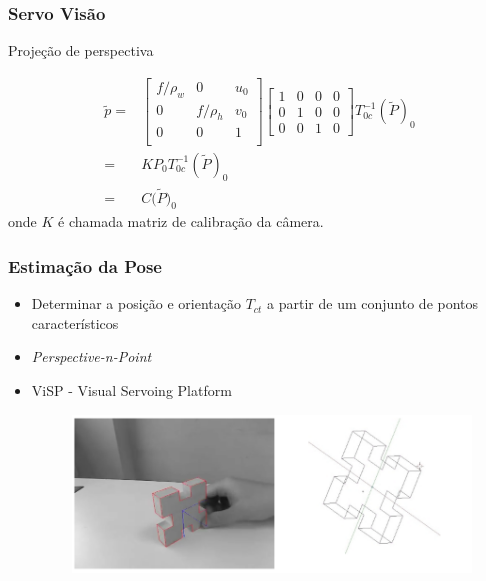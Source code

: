 \documentclass{beamer}
\newcommand\m[1]{\begin{bmatrix}#1\end{bmatrix}}
\begin{document}
\begin{frame}
\frametitle{Servo Visão}

\begin{block}{Projeção de perspectiva} %

\begin{align}\label{eq:camera_projection}
{\tilde{p}} =& 
\m {
	f/\rho_w & 0 & u_0 \\
	0        & f/\rho_h &v_0 \\
	0 & 0 & 1 \\
}
\m{  1 & 0 & 0 & 0\\
	 0 & 1 & 0 & 0\\
	 0 & 0 & 1 & 0	
}
{T}_{0c}^{-1} (\tilde{{P}})_0\\
=& {K} {P}_0 {T}_{0c}^{-1} (\tilde{{P}})_0 \\ 
=& {C} ({\tilde{P})_0}
\end{align}
onde $K$ é chamada matriz de calibração da câmera.
\end{block}
\end{frame}


\begin{frame}
\frametitle{Estimação da Pose}
\begin{itemize}
\item Determinar a posição e orientação ${T}_{ct}$ a partir de um conjunto de pontos característicos
\item \textit{Perspective-n-Point}
\item ViSP - Visual Servoing Platform
\begin{figure}
\includegraphics[width=0.75\linewidth]{./img/visp.png}
\end{figure}
\end{itemize}
\end{frame}
\end{document}
